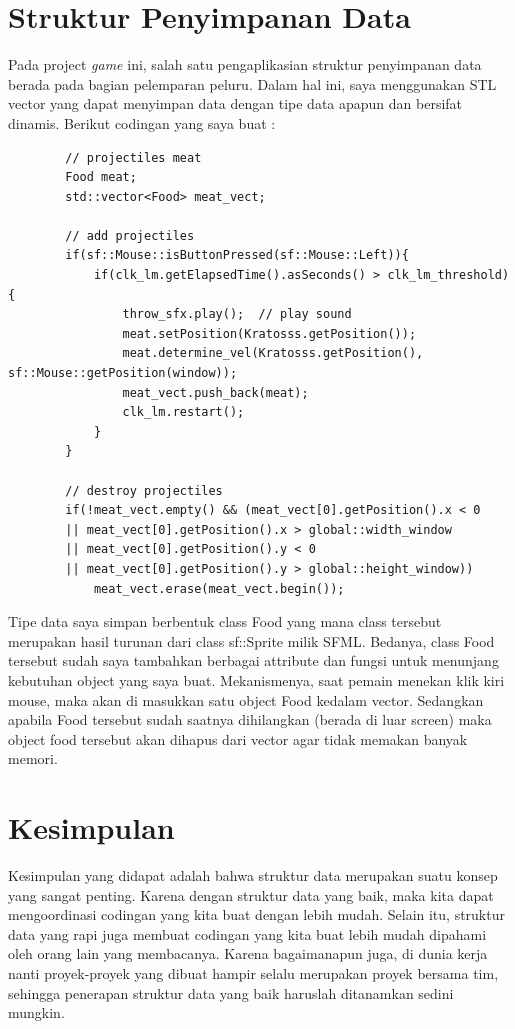 \documentclass[oneside, a4paper ,12pt]{book}
\begin{document}
	\chapter{Struktur Penyimpanan Data}
	Pada project \emph{game} ini, salah satu pengaplikasian struktur penyimpanan data berada pada bagian pelemparan peluru. Dalam hal ini, saya menggunakan STL vector yang dapat menyimpan data dengan tipe data apapun dan bersifat dinamis. Berikut codingan yang saya buat :
	\begin{verbatim}
		// projectiles meat
		Food meat;
		std::vector<Food> meat_vect;
		
		// add projectiles
		if(sf::Mouse::isButtonPressed(sf::Mouse::Left)){
			if(clk_lm.getElapsedTime().asSeconds() > clk_lm_threshold){
				throw_sfx.play();  // play sound
				meat.setPosition(Kratosss.getPosition());
				meat.determine_vel(Kratosss.getPosition(), sf::Mouse::getPosition(window));
				meat_vect.push_back(meat);
				clk_lm.restart();
			}
		}
	
		// destroy projectiles
		if(!meat_vect.empty() && (meat_vect[0].getPosition().x < 0 
		|| meat_vect[0].getPosition().x > global::width_window
		|| meat_vect[0].getPosition().y < 0 
		|| meat_vect[0].getPosition().y > global::height_window))
			meat_vect.erase(meat_vect.begin());
	\end{verbatim}
	Tipe data saya simpan berbentuk class Food yang mana class tersebut merupakan hasil turunan dari class sf::Sprite milik SFML. Bedanya, class Food tersebut sudah saya tambahkan berbagai attribute dan fungsi untuk menunjang kebutuhan object yang saya buat. Mekanismenya, saat pemain menekan klik kiri mouse, maka akan di masukkan satu object Food kedalam vector. Sedangkan apabila Food tersebut sudah saatnya dihilangkan (berada di luar screen) maka object food tersebut akan dihapus dari vector agar tidak memakan banyak memori.
	
	\chapter{Kesimpulan}
	Kesimpulan yang didapat adalah bahwa struktur data merupakan suatu konsep yang sangat penting. Karena dengan struktur data yang baik, maka kita dapat mengoordinasi codingan yang kita buat dengan lebih mudah. Selain itu, struktur data yang rapi juga membuat codingan yang kita buat lebih mudah dipahami oleh orang lain yang membacanya. Karena bagaimanapun juga, di dunia kerja nanti proyek-proyek yang dibuat hampir selalu merupakan proyek bersama tim, sehingga penerapan struktur data yang baik haruslah ditanamkan sedini mungkin.
	
\end{document}

